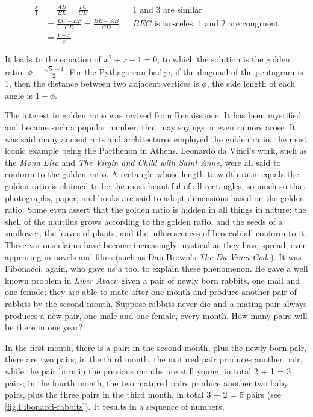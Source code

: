 \documentclass[b5paper]{article}
\begin{document}
\begin{align*}
\frac{x}{1} &= \frac{AB}{BE} = \frac{FC}{CD} && \text{1 and 3 are similar} \\
            &= \frac{EC - EF}{CD} = \frac{BE - AB}{CD} && BEC\text{ is isosceles, 1 and 2 are congruent} \\
            &= \frac{1-x}{x}
\end{align*}

It leads to the equation of $x^2 + x - 1 = 0$, to which the solution is the golden ratio: $\phi = \frac{\sqrt{5} - 1}{2}$. For the Pythagorean badge, if the diagonal of the pentagram is 1, then the distance between two adjacent vertices is $\phi$, the side length of each angle is $1 - \phi$.

 \label{sec:Fibonacci-numbers}
The interest in golden ratio was revived from Renaissance. It has been mystified and became such a popular number, that may sayings or even rumors arose. It was said many ancient arts and architectures employed the golden ratio, the most iconic example being the Parthenon in Athens. Leonardo da Vinci's work, such as the \emph{Mona Lisa} and \emph{The Virgin and Child with Saint Anne}, were all said to conform to the golden ratio. A rectangle whose length-to-width ratio equals the golden ratio is claimed to be the most beautiful of all rectangles, so much so that photographs, paper, and books are said to adopt dimensions based on the golden ratio. Some even assert that the golden ratio is hidden in all things in nature: the shell of the nautilus grows according to the golden ratio, and the seeds of a sunflower, the leaves of plants, and the inflorescences of broccoli all conform to it. These various claims have become increasingly mystical as they have spread, even appearing in novels and films (such as Dan Brown's \emph{The Da Vinci Code}). It was Fibonacci, again, who gave us a tool to explain these phenomenon. He gave a well known problem in \emph{Liber Abaci}: given a pair of newly born rabbits, one mail and one female; they are able to mate after one month and produce another pair of rabbits by the second month. Suppose rabbits never die and a mating pair always produces a new pair, one male and one female, every month. How many pairs will be there in one year?

In the first month, there is a pair; in the second month, plus the newly born pair, there are two pairs; in the third month, the matured pair produces another pair, while the pair born in the previous months are still young, in total 2 + 1 = 3 pairs; in the fourth month, the two matured pairs produce another two baby pairs, plus the three pairs in the third month, in total 3 + 2 = 5 pairs (see \cref{fig:Fibonacci-rabbits}). It results in a sequence of numbers,
\end{document}
